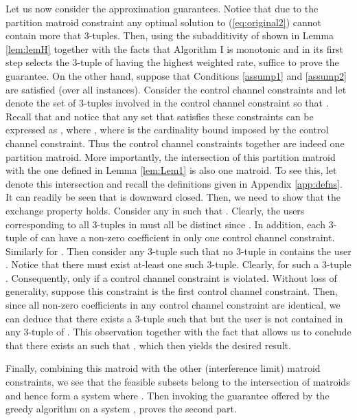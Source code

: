 \documentclass[11pt] {article}
\begin{document}
Let us now consider the approximation guarantees.
Notice that due to the partition matroid constraint any optimal solution to (\ref{eq:original2}) cannot contain more that  3-tuples. Then, using the subadditivity of  shown in Lemma \ref{lem:lemH} together with the facts that Algorithm I is monotonic and in its first step selects the 3-tuple of   having the highest weighted rate, suffice to prove the  guarantee. On the other hand, suppose that Conditions \ref{assump1} and \ref{assump2} are satisfied (over all instances). Consider the  control channel constraints and  let   denote the set of 3-tuples involved in the  control channel constraint so that . Recall that  and notice that any set  that satisfies these  constraints can be expressed as , where , where  is the cardinality bound imposed by the  control channel constraint. Thus the  control channel constraints together are indeed one partition matroid.
More importantly, the intersection of this partition matroid with the one defined in Lemma \ref{lem:Lem1} is also one matroid. To see this, let  denote this intersection and recall the definitions given in Appendix \ref{app:defns}. It can readily be seen that  is downward closed. Then, we need to show that the exchange property holds. Consider any
  in  such that .  Clearly, the users corresponding to all 3-tuples in  must all be distinct since . In addition, each 3-tuple of  can   have a non-zero coefficient in only one control channel constraint. Similarly for . Then consider any 3-tuple  such that no 3-tuple in  contains the user . Notice that there must exist at-least one such 3-tuple. Clearly, for such a 3-tuple . Consequently,  only if
  a control channel constraint  is violated. Without loss of generality, suppose this constraint is the first control channel constraint. Then, since all non-zero coefficients in any control channel constraint are identical, we can deduce that there exists a 3-tuple    such that  but the user
    is not contained in any 3-tuple of . This observation together with the fact that  allows us to conclude that there exists an  such that   , which then yields the desired result.


Finally, combining this matroid with the  other  (interference limit) matroid constraints, we see that the feasible subsets belong to the intersection of  matroids and hence form a system where . Then invoking the guarantee offered by the greedy algorithm on a system \cite{nemhaus:analysis,nemhaus:algo}, proves the second part.\endproof
\end{document}
